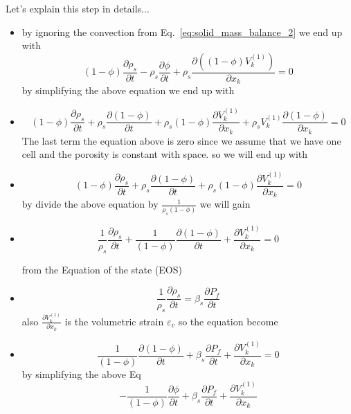\documentclass[]{scrreprt}
\begin{document}
\ifshowallderivations
	Let's explain this step in details...
	\begin{itemize}
	\item by ignoring  the convection from Eq.~\ref{eq:solid_mass_balance_2} we end up with 
	\begin{equation}
  (1-\phi) \frac{\partial \rho_s }{\partial t} - \rho_s\frac{\partial \phi }{\partial t} + \rho_s\frac{\partial( (1-\phi) V^{(1)}_k)}{\partial x_k} = 0 
\end{equation}
by simplifying the above equation we end up with 
	\item
	\begin{equation}
  (1-\phi) \frac{\partial \rho_s }{\partial t} + \rho_s\frac{\partial(1-\phi) }{\partial t} + \rho_s(1-\phi)\frac{ \partial  V^{(1)}_k}{\partial x_k}+\rho_s  V^{(1)}_k \frac{\partial(1-\phi)}{\partial x_k} = 0  
\end{equation}
The last term the equation above is zero since we assume that we have one cell and the porosity is constant with space. so we will end up with 	
	
	\item  
	\begin{equation}
	(1-\phi) \frac{\partial \rho_s }{\partial t} + \rho_s\frac{\partial(1-\phi) }{\partial t} + \rho_s(1-\phi)\frac{ \partial  V^{(1)}_k}{\partial x_k}=0
	\end{equation}
	by divide the above equation by $\frac{1}{\rho_s(1-\phi)}$ we will gain
	\item 
	\begin{equation}
	\frac{1}{\rho_s}\frac{\partial \rho_s }{\partial t} + \frac{1}{(1-\phi)}\frac{\partial(1-\phi) }{\partial t} + \frac{ \partial  V^{(1)}_k}{\partial x_k}=0
	\end{equation}
	
	from the Equation of the state (EOS)
	
	
	\item \begin{equation}
	\frac{1}{\rho_s}\frac{\partial \rho_s }{\partial t}= \beta_s\frac{\partial P_f}{\partial t}
	\end{equation}
	also $ \frac{ \partial  V^{(1)}_k}{\partial x_k}$ is the volumetric strain $\varepsilon_v$ so the equation become 
	\item 
	\begin{equation}
	\frac{1}{(1-\phi)}\frac{\partial(1-\phi) }{\partial t} +\beta_s\frac{\partial P_f}{\partial t}+\frac{ \partial  V^{(1)}_k}{\partial x_k} =0
	\end{equation}
	by simplifying the above Eq
	\begin{equation}
	-\frac{1}{(1-\phi)}\frac{\partial\phi }{\partial t} +\beta_s\frac{\partial P_f}{\partial t}+\frac{ \partial  V^{(1)}_k}{\partial x_k} 
	\end{equation}
	

\end{itemize}
\end{document}
